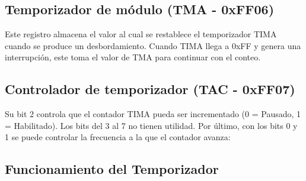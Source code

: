 \subsection{Temporizador de módulo (TMA - 0xFF06)}
Este registro almacena el valor al cual se restablece el temporizador TIMA cuando se produce un desbordamiento. Cuando TIMA llega a 0xFF y genera una interrupción, este toma el valor de TMA para continuar con el conteo.

\subsection{Controlador de temporizador (TAC - 0xFF07)}
Su bit 2 controla que el contador TIMA pueda ser incrementado (0 = Pausado, 1 = Habilitado). Los bits del 3 al 7 no tienen utilidad. Por último, con los bits 0 y 1 se puede controlar la frecuencia a la que el contador avanza:

\begin{table}[h!]
    \centering
    \caption{Selección de modos de reloj y sus frecuencias.}
\end{table}

\subsection{Funcionamiento del Temporizador}

